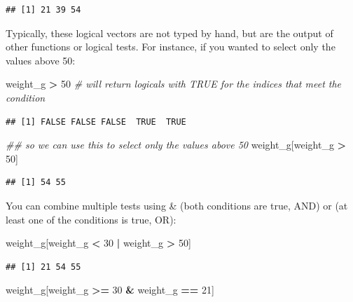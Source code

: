 \documentclass[]{book}
\newenvironment{Shaded}{\begin{snugshade}}{\end{snugshade}}
\newcommand{\CommentTok}[1]{\textcolor[rgb]{0.56,0.35,0.01}{\textit{#1}}}
\newcommand{\DecValTok}[1]{\textcolor[rgb]{0.00,0.00,0.81}{#1}}
\newcommand{\NormalTok}[1]{#1}
\newcommand{\OperatorTok}[1]{\textcolor[rgb]{0.81,0.36,0.00}{\textbf{#1}}}
\newcommand{\StringTok}[1]{\textcolor[rgb]{0.31,0.60,0.02}{#1}}
\begin{document}
\begin{verbatim}
## [1] 21 39 54
\end{verbatim}

Typically, these logical vectors are not typed by hand, but are the output of other functions or logical tests. For instance, if you wanted to select only the values above 50:

\begin{Shaded}
\begin{Highlighting}[]
\NormalTok{weight_g }\OperatorTok{>}\StringTok{ }\DecValTok{50}    \CommentTok{# will return logicals with TRUE for the indices that meet the condition}
\end{Highlighting}
\end{Shaded}

\begin{verbatim}
## [1] FALSE FALSE FALSE  TRUE  TRUE
\end{verbatim}

\begin{Shaded}
\begin{Highlighting}[]
\CommentTok{## so we can use this to select only the values above 50}
\NormalTok{weight_g[weight_g }\OperatorTok{>}\StringTok{ }\DecValTok{50}\NormalTok{]}
\end{Highlighting}
\end{Shaded}

\begin{verbatim}
## [1] 54 55
\end{verbatim}

You can combine multiple tests using \& (both conditions are true, AND) or \textbar{} (at least one of the conditions is true, OR):

\begin{Shaded}
\begin{Highlighting}[]
\NormalTok{weight_g[weight_g }\OperatorTok{<}\StringTok{ }\DecValTok{30} \OperatorTok{|}\StringTok{ }\NormalTok{weight_g }\OperatorTok{>}\StringTok{ }\DecValTok{50}\NormalTok{]}
\end{Highlighting}
\end{Shaded}

\begin{verbatim}
## [1] 21 54 55
\end{verbatim}

\begin{Shaded}
\begin{Highlighting}[]
\NormalTok{weight_g[weight_g }\OperatorTok{>=}\StringTok{ }\DecValTok{30} \OperatorTok{&}\StringTok{ }\NormalTok{weight_g }\OperatorTok{==}\StringTok{ }\DecValTok{21}\NormalTok{]}
\end{Highlighting}
\end{Shaded}
\end{document}
